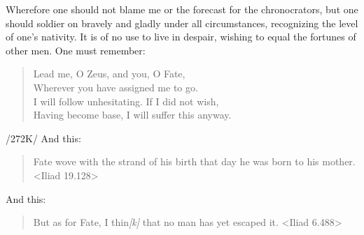Wherefore one should not blame me or the forecast for the chronocrators, but one should soldier on bravely and gladly under all circumstances, recognizing the level of one’s nativity. It is of no use to live in despair, wishing to equal the fortunes of other men. One must remember: 
\begin{verse}
Lead me, O Zeus, and you, O Fate, \\
Wherever you have assigned me to go. \\
I will follow unhesitating. If I did not wish,  \\
Having become base, I will suffer this anyway. \\
\end{verse}

/272K/ And this:
\begin{verse}
Fate wove with the strand of his birth that day he was born to his mother. <Iliad 19.128>
\end{verse}

And this:
\begin{verse}
But as for Fate, I thin\textsl{[k]} that no man has yet escaped it. <Iliad 6.488>
\end{verse}

\newpage